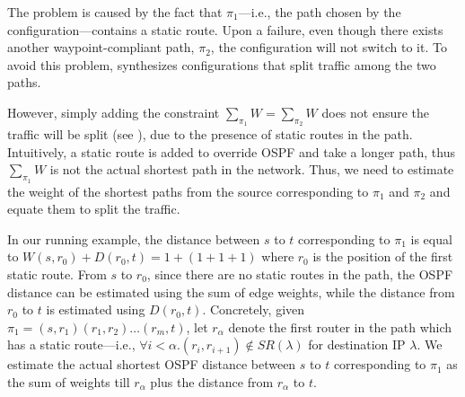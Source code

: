 The problem is caused by the fact that $\pi_1$---i.e.,
the
path chosen by the configuration---contains a static route.
Upon a failure, even though there exists another
waypoint-compliant path, $\pi_2$, the configuration will not switch to it.
To avoid this problem, 
\name synthesizes 
configurations that split  traffic among the two paths.

However, simply  adding
the constraint $\sum_{\pi_1} W= \sum_{\pi_2}W$ does not ensure the 
traffic will be split (see ), due to the 
presence of static routes in the path. Intuitively, a static route
is added to override OSPF and take a longer path, thus $\sum_{\pi_1}W$
is not the actual shortest path in the network. Thus, we need to estimate 
the weight of the shortest paths from the source 
corresponding to $\pi_1$ and $\pi_2$ and 
equate them to split the traffic.

 In our running example,  
 the distance between $s$ to $t$ corresponding
 to $\pi_1$ is equal to 
 $W(s, r_0) + D(r_0, t) = 1 + (1 + 1 + 1)$ where $r_0$
 is the position of the first static route. From $s$ to 
 $r_0$, since there are no static routes in the path, the  
 OSPF distance can be estimated using the sum of edge weights,
 while the distance from $r_0$ to $t$ is estimated using $D(r_0, t)$.
 Concretely, given $\pi_1 = (s, r_1)(r_1, r_2) \ldots (r_m, t)$, let 
 $r_\alpha$ denote the first router in the path which has a static route---i.e., 
 $\forall i < \alpha. (r_i, r_{i+1}) \not\in SR(\lambda)$ for destination IP $\lambda$.
 We estimate
 the actual shortest OSPF distance  
 between $s$ to $t$ 
 corresponding to $\pi_1$ 
 as the sum of weights till $r_\alpha$ plus the distance
 from $r_\alpha$ to $t$. 
 
